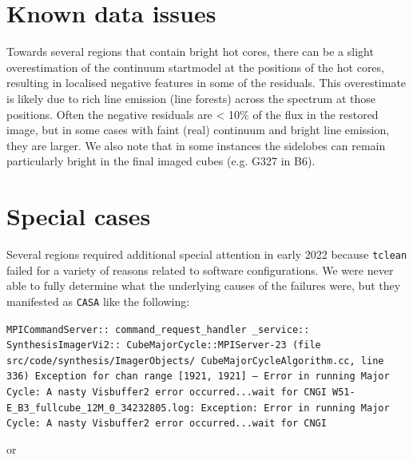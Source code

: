 \documentclass[longauth]{aa} %
\newcommand\tclean{\texttt{tclean}\xspace}
\begin{document}
\begin{appendix}
\section{Known data issues}

Towards several regions that contain bright hot cores, there can be a slight overestimation of the continuum startmodel at the positions of the hot cores, resulting in localised negative features in some of the residuals. This overestimate is likely due to rich line emission (line forests) across the spectrum at those positions. Often the negative residuals are < 10\% of the flux in the restored image, but in some cases with faint (real) continuum and bright line emission, they are larger. We also note that in some instances the sidelobes can remain particularly bright in the final imaged cubes (e.g. G327 in B6). 



\section{Special cases}

Several regions required additional special attention in early 2022 because \tclean failed for a variety of reasons related to software configurations.
We were never able to fully determine what the underlying causes of the failures were, but they manifested as \texttt{CASA} like the following:

\noindent 
\texttt{MPICommandServer:: 
command\_request\_handler
\_service:: SynthesisImagerVi2:: CubeMajorCycle::MPIServer-23 (file src/code/synthesis/ImagerObjects/ CubeMajorCycleAlgorithm.cc, line 336)      Exception for chan range [1921, 1921] ---   Error in running Major Cycle: A nasty Visbuffer2 error occurred...wait for CNGI
W51-E\_B3\_fullcube\_12M\_0\_34232805.log: Exception: Error in running Major Cycle: A nasty Visbuffer2 error occurred...wait for CNGI}

or


\end{appendix}
\end{document}
